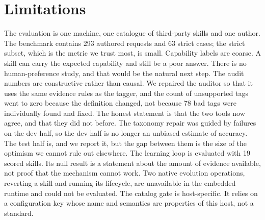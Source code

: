 \documentclass[sigconf,acmsmall]{acmart}
\begin{document}
\section{Limitations}
The evaluation is one machine, one catalogue of third-party skills and one author. The benchmark contains 293 authored requests and 63 strict cases; the strict subset, which is the metric we trust most, is small.
Capability labels are coarse. A skill can carry the expected capability and still be a poor answer. There is no human-preference study, and that would be the natural next step.
The audit numbers are constructive rather than causal. We repaired the auditor so that it uses the same evidence rules as the tagger, and the count of unsupported tags went to zero because the definition changed, not because 78 bad tags were individually found and fixed. The honest statement is that the two tools now agree, and that they did not before.
The taxonomy repair was guided by failures on the dev half, so the dev half is no longer an unbiased estimate of accuracy. The test half is, and we report it, but the gap between them is the size of the optimism we cannot rule out elsewhere.
The learning loop is evaluated with 19 scored skills. Its null result is a statement about the amount of evidence available, not proof that the mechanism cannot work.
Two native evolution operations, reverting a skill and running its lifecycle, are unavailable in the embedded runtime and could not be evaluated.
The catalog gate is host-specific. It relies on a configuration key whose name and semantics are properties of this host, not a standard.
\end{document}
